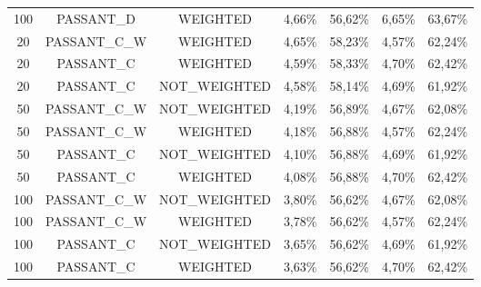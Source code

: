 \begin{table}[H]
{\begin{tabular}{ccccccc}
			100 &  PASSANT\_D &   WEIGHTED &     4,66\% &    56,62\% &     6,65\% &    63,67\% \\
			
			20 & PASSANT\_C\_W &   WEIGHTED &     4,65\% &    58,23\% &     4,57\% &    62,24\% \\
			
			20 &  PASSANT\_C &   WEIGHTED &     4,59\% &    58,33\% &     4,70\% &    62,42\% \\
			
			20 &  PASSANT\_C & NOT\_WEIGHTED &     4,58\% &    58,14\% &     4,69\% &    61,92\% \\
			
			50 & PASSANT\_C\_W & NOT\_WEIGHTED &     4,19\% &    56,89\% &     4,67\% &    62,08\% \\
			
			50 & PASSANT\_C\_W &   WEIGHTED &     4,18\% &    56,88\% &     4,57\% &    62,24\% \\
			
			50 &  PASSANT\_C & NOT\_WEIGHTED &     4,10\% &    56,88\% &     4,69\% &    61,92\% \\
			
			50 &  PASSANT\_C &   WEIGHTED &     4,08\% &    56,88\% &     4,70\% &    62,42\% \\
			
			100 & PASSANT\_C\_W & NOT\_WEIGHTED &     3,80\% &    56,62\% &     4,67\% &    62,08\% \\
			
			100 & PASSANT\_C\_W &   WEIGHTED &     3,78\% &    56,62\% &     4,57\% &    62,24\% \\
			
			100 &  PASSANT\_C & NOT\_WEIGHTED &     3,65\% &    56,62\% &     4,69\% &    61,92\% \\
			
			100 &  PASSANT\_C &   WEIGHTED &     3,63\% &    56,62\% &     4,70\% &    62,42\% \\
			
		\end{tabular}  
	}
\end{table}

